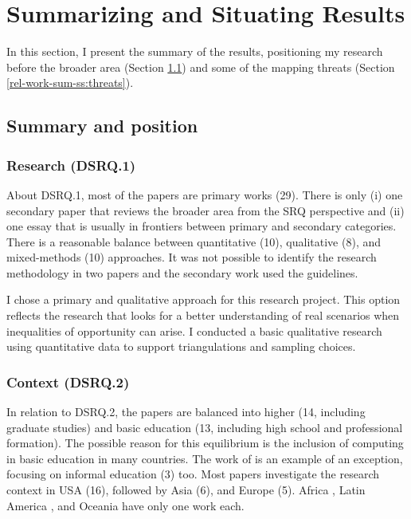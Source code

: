 \section{Summarizing and Situating Results}
\label{rel-work:sum-results}

In this section, I present the summary of the results, positioning my research before the broader area (Section \ref{rel-work-sum-ss:summary}) and some of the mapping threats (Section \ref{rel-work-sum-ss:threats}).

\subsection{Summary and position}
\label{rel-work-sum-ss:summary}

\subsubsection{Research (DSRQ.1)}

About \gls{DSRQ}.1, most of the papers are primary works (29). There is only (i) one secondary paper \cite{lai:2023}  that reviews the broader area from the \gls{SRQ} perspective and (ii) one essay \cite{michaelis:2022} that is usually in frontiers between primary and secondary categories. There is a reasonable balance between quantitative (10), qualitative (8), and mixed-methods (10) approaches. It was not possible to identify the research methodology in two papers \cite{michaelis:2022,akalin:2021} and the secondary work used the  guidelines.

I chose a primary and qualitative approach for this research project. This option reflects the research that looks for a better understanding of real scenarios when inequalities of opportunity can arise. I conducted a basic qualitative research using quantitative data to support triangulations and sampling choices.

\subsubsection{Context (DSRQ.2)}

In relation to \gls{DSRQ}.2, the papers are balanced into higher (14, including graduate studies) and basic education (13, including high school and professional formation). The possible reason for this equilibrium is the inclusion of computing in basic education in many countries. The work of  is an example of an exception, focusing on informal education (3) too. Most papers investigate the research context in \gls{USA} (16), followed by Asia (6), and Europe (5). Africa \cite{arawjo:2021}, Latin America \cite{roque-hernandez:2021}, and Oceania \cite{shahin:2022} have only one work each.

